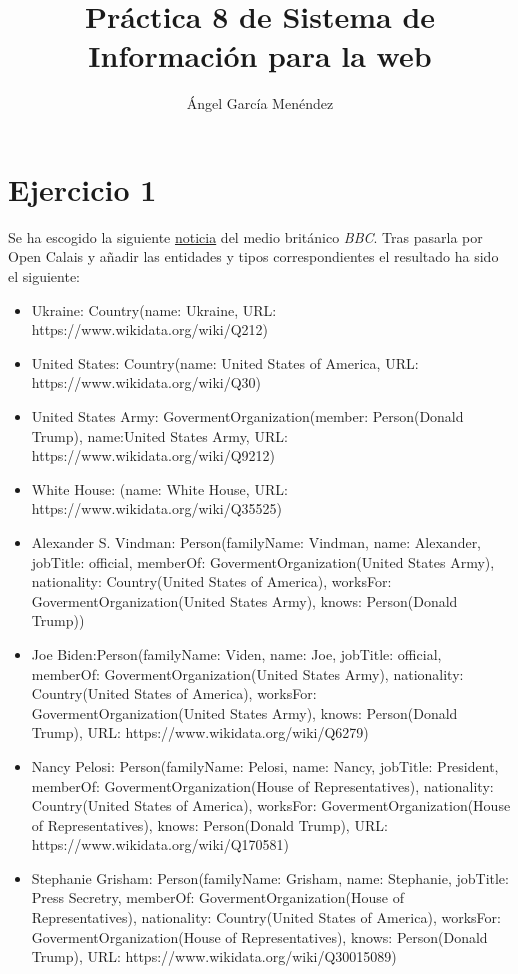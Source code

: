 \documentclass{report}
\begin{document}
\title{Práctica 8 de Sistema de Información para la web}
\author{Ángel García Menéndez}

\maketitle

\section{Ejercicio 1}

Se ha escogido la siguiente \href{https://www.bbc.com/news/world-us-canada-50214895}{noticia} del medio británico \textit{BBC}.
Tras pasarla por Open Calais y añadir las entidades y tipos correspondientes el resultado ha sido el siguiente:

\begin{itemize}
\item Ukraine: Country(name: Ukraine, URL: https://www.wikidata.org/wiki/Q212)
\item United States: Country(name: United States of America, URL: https://www.wikidata.org/wiki/Q30)
\item United States Army: GovermentOrganization(member: Person(Donald Trump), name:United States Army, URL: https://www.wikidata.org/wiki/Q9212)
\item White House: (name: White House, URL: https://www.wikidata.org/wiki/Q35525)
\item Alexander S. Vindman: Person(familyName: Vindman, name: Alexander, jobTitle: official, memberOf: GovermentOrganization(United States Army), nationality: Country(United States of America), worksFor: GovermentOrganization(United States Army), knows: Person(Donald Trump))
\item Joe Biden:Person(familyName: Viden, name: Joe, jobTitle: official, memberOf: GovermentOrganization(United States Army), nationality: Country(United States of America), worksFor: GovermentOrganization(United States Army), knows: Person(Donald Trump), URL: https://www.wikidata.org/wiki/Q6279)
\item Nancy Pelosi: Person(familyName: Pelosi, name: Nancy, jobTitle: President, memberOf: GovermentOrganization(House of Representatives), nationality: Country(United States of America), worksFor: GovermentOrganization(House of Representatives), knows: Person(Donald Trump), URL: https://www.wikidata.org/wiki/Q170581)
\item Stephanie Grisham: Person(familyName: Grisham, name: Stephanie, jobTitle: Press Secretry, memberOf: GovermentOrganization(House of Representatives), nationality: Country(United States of America), worksFor: GovermentOrganization(House of Representatives), knows: Person(Donald Trump), URL: https://www.wikidata.org/wiki/Q30015089)

\end{itemize}
\end{document}
